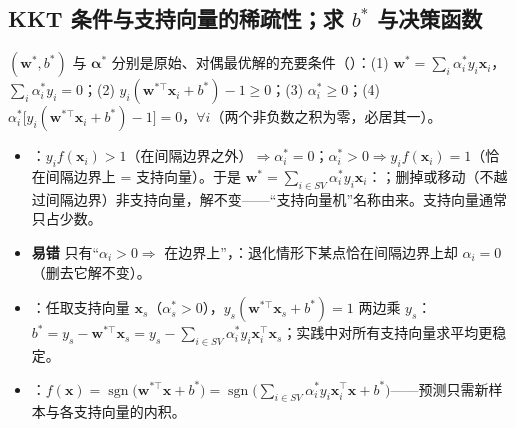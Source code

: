 \subsection{KKT 条件与支持向量的稀疏性；求 \texorpdfstring{$b^*$}{b*} 与决策函数 \tagext}
$(\bm w^*,b^*)$ 与 $\bm\alpha^*$ 分别是原始、对偶最优解的充要条件（）：(1)  $\bm w^*=\sum_i\alpha_i^*y_i\bm x_i$，$\sum_i\alpha_i^*y_i=0$；(2)  $y_i(\bm w^{*\top}\bm x_i+b^*)-1\ge0$；(3)  $\alpha_i^*\ge0$；(4)  $\alpha_i^*\big[y_i(\bm w^{*\top}\bm x_i+b^*)-1\big]=0$，$\forall i$（两个非负数之积为零，必居其一）。
\begin{itemize}
\item {}：$y_if(\bm x_i)>1$（在间隔边界之外）$\Rightarrow\alpha_i^*=0$；$\alpha_i^*>0\Rightarrow y_if(\bm x_i)=1$（恰在间隔边界上 = 支持向量）。于是 $\bm w^*=\sum_{i\in SV}\alpha_i^*y_i\bm x_i$：；删掉或移动（不越过间隔边界）非支持向量，解不变——“支持向量机”名称由来。支持向量通常只占少数。
\item \textbf{易错} 只有“$\alpha_i>0\Rightarrow$ 在边界上”，：退化情形下某点恰在间隔边界上却 $\alpha_i=0$（删去它解不变）。
\item {}：任取支持向量 $\bm x_s$（$\alpha_s^*>0$），$y_s(\bm w^{*\top}\bm x_s+b^*)=1$ 两边乘 $y_s$：$b^*=y_s-\bm w^{*\top}\bm x_s=y_s-\sum_{i\in SV}\alpha_i^*y_i\bm x_i^\top\bm x_s$；实践中对所有支持向量求平均更稳定。
\item {}：$f(\bm x)=\operatorname{sgn}\big(\bm w^{*\top}\bm x+b^*\big)=\operatorname{sgn}\big(\sum_{i\in SV}\alpha_i^*y_i\bm x_i^\top\bm x+b^*\big)$——预测只需新样本与各支持向量的内积。
\end{itemize}

